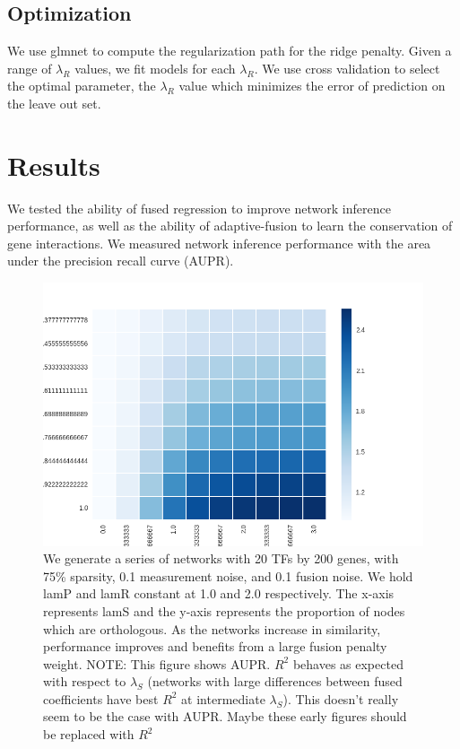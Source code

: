 \documentclass[11pt]{article}
\begin{document}
\subsection{Optimization}
We use glmnet to compute the regularization path for the
 ridge penalty. Given a range of $\lambda_R$ values, we fit models for each $\lambda_R$. We use cross validation to select the optimal parameter, the $\lambda_R$ value which minimizes the error of prediction on the leave out set.   

\section{Results}
We tested the ability of fused regression to improve network inference performance, as well as the ability of adaptive-fusion to learn the conservation of gene interactions. We measured network inference performance with the area under the precision recall curve (AUPR). 

\begin{figure}
\begin{center}
  \includegraphics[scale=0.45]{l2fusionquick.png}
  \caption{\label{fig:figure1} We generate a series of networks with 20 TFs by 200 genes, with 75\% sparsity, 0.1 measurement noise, and 0.1 fusion noise. We hold lamP and lamR constant at 1.0 and 2.0 respectively. The x-axis represents lamS and the y-axis represents the proportion of nodes which are orthologous. As the networks increase in similarity, performance improves and benefits from a large fusion penalty weight. NOTE: This figure shows AUPR. $R^2$ behaves as expected with respect to $\lambda_S$ (networks with large differences between fused coefficients have best $R^2$ at intermediate $\lambda_S$). This doesn't really seem to be the case with AUPR. Maybe these early figures should be replaced with $R^2$}
  \end{center}
\end{figure}
\end{document}
